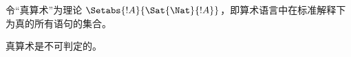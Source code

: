 \documentclass[../../../include/open-logic-section]{subfiles}
\begin{document}
令“真算术”为理论 $\Setabs{!A}{ \Sat{\Nat}{!A}}$，即算术语言中在标准解释下为真的所有语句的集合。

\begin{cor}
真算术是不可判定的。
\end{cor}

\end{document}
